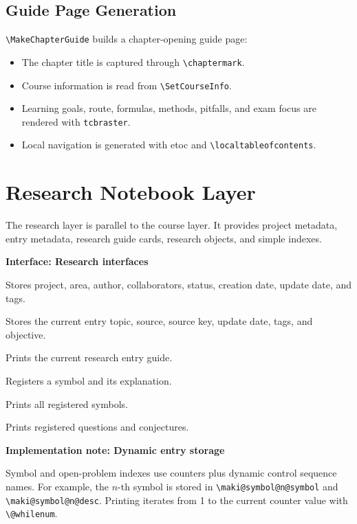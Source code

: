 \documentclass[a4paper,11pt]{ltxdoc}
\newcommand{\mpkg}[1]{\textsf{#1}}
\newcommand{\menv}[1]{\texttt{#1}}
\newcommand{\mcmd}[1]{\texttt{\textbackslash#1}}
\newenvironment{implementation}[1]
  {\par\medskip\noindent\textbf{\color{MakiBlue}Implementation note: #1}\par\smallskip}
  {\par\medskip}
\newenvironment{interfaceblock}[1]
  {\par\medskip\noindent\textbf{\color{MakiBlue}Interface: #1}\par\smallskip\begin{description}[leftmargin=3.2cm,style=nextline]}
  {\end{description}\par\medskip}
\begin{document}
\subsection{Guide Page Generation}

\mcmd{MakeChapterGuide} builds a chapter-opening guide page:

\begin{itemize}
\item The chapter title is captured through \mcmd{chaptermark}.
\item Course information is read from \mcmd{SetCourseInfo}.
\item Learning goals, route, formulas, methods, pitfalls, and exam focus are rendered with \menv{tcbraster}.
\item Local navigation is generated with \mpkg{etoc} and \mcmd{localtableofcontents}.
\end{itemize}

\section{Research Notebook Layer}

The research layer is parallel to the course layer. It provides project metadata,
entry metadata, research guide cards, research objects, and simple indexes.

\begin{interfaceblock}{Research interfaces}
\item[\mcmd{SetResearchInfo}] Stores project, area, author, collaborators, status, creation date, update date, and tags.
\item[\mcmd{SetEntryInfo}] Stores the current entry topic, source, source key, update date, tags, and objective.
\item[\mcmd{MakeEntryGuide}] Prints the current research entry guide.
\item[\mcmd{DeclareSymbol}] Registers a symbol and its explanation.
\item[\mcmd{PrintSymbolIndex}] Prints all registered symbols.
\item[\mcmd{PrintOpenProblemIndex}] Prints registered questions and conjectures.
\end{interfaceblock}

\begin{implementation}{Dynamic entry storage}
Symbol and open-problem indexes use counters plus dynamic control sequence names.
For example, the \(n\)-th symbol is stored in
\verb|\maki@symbol@n@symbol| and \verb|\maki@symbol@n@desc|. Printing iterates
from 1 to the current counter value with \mcmd{@whilenum}.
\end{implementation}
\end{document}
